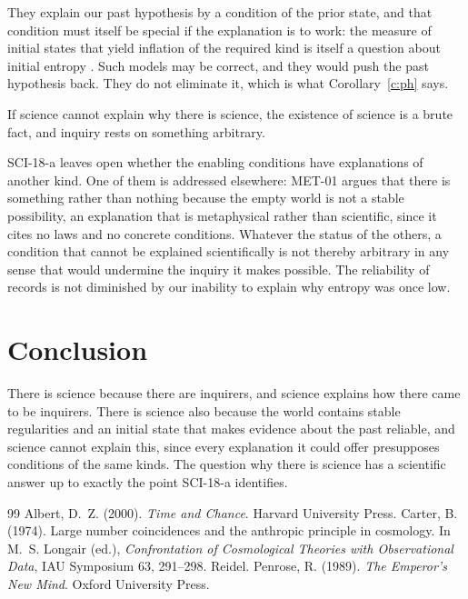 \documentclass{situationist-preprint}
\begin{document}
\begin{reply}
They explain our past hypothesis by a condition of the prior state, and that condition must itself be special if the explanation is to work: the measure of initial states that yield inflation of the required kind is itself a question about initial entropy \citep{Penrose1989}. Such models may be correct, and they would push the past hypothesis back. They do not eliminate it, which is what Corollary~\ref{c:ph} says.
\end{reply}

\begin{objection}
If science cannot explain why there is science, the existence of science is a brute fact, and inquiry rests on something arbitrary.
\end{objection}

\begin{reply}
SCI-18-a leaves open whether the enabling conditions have explanations of another kind. One of them is addressed elsewhere: MET-01 argues that there is something rather than nothing because the empty world is not a stable possibility, an explanation that is metaphysical rather than scientific, since it cites no laws and no concrete conditions. Whatever the status of the others, a condition that cannot be explained scientifically is not thereby arbitrary in any sense that would undermine the inquiry it makes possible. The reliability of records is not diminished by our inability to explain why entropy was once low.
\end{reply}

\section{Conclusion}

There is science because there are inquirers, and science explains how there came to be inquirers. There is science also because the world contains stable regularities and an initial state that makes evidence about the past reliable, and science cannot explain this, since every explanation it could offer presupposes conditions of the same kinds. The question why there is science has a scientific answer up to exactly the point SCI-18-a identifies.

\begin{thebibliography}{99}\small
{} Albert, D.~Z. (2000). \emph{Time and Chance}. Harvard University Press.
 Carter, B. (1974). Large number coincidences and the anthropic principle in cosmology. In M.~S. Longair (ed.), \emph{Confrontation of Cosmological Theories with Observational Data}, IAU Symposium 63, 291--298. Reidel.
 Penrose, R. (1989). \emph{The Emperor's New Mind}. Oxford University Press.
\end{thebibliography}
\end{document}

